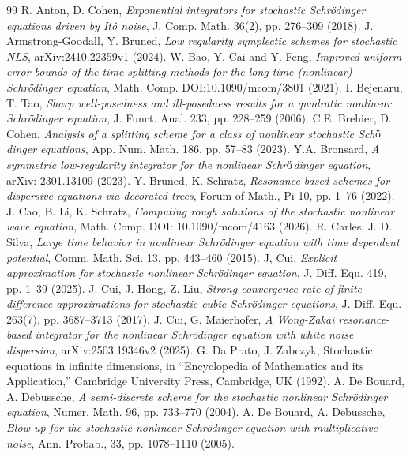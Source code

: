 \documentclass[a4paper]{amsart}
\begin{document}
\begin{thebibliography}{99}
R. Anton, D. Cohen, {\em Exponential integrators for stochastic Schrödinger equations driven by Itô noise}, J. Comp. Math. 36(2), pp. 276--309 (2018).
J. Armstrong-Goodall, Y. Bruned, {\em Low regularity symplectic schemes for stochastic NLS}, arXiv:2410.22359v1 (2024).
W. Bao, Y. Cai and Y. Feng, {\em Improved uniform error bounds of the time-splitting methods
for the long-time (nonlinear) Schrödinger equation}, Math. Comp. DOI:10.1090/mcom/3801 (2021).
  I. Bejenaru, T. Tao, {\em Sharp well-posedness and ill-posedness results for a quadratic nonlinear Schrödinger equation}, J. Funct. Anal. 233, pp. 228--259 (2006).
C.E. Brehier, D. Cohen, {\em Analysis of a splitting scheme for a class of nonlinear stochastic Sch$\ddot{\rm o}$dinger equations}, App. Num. Math. 186, pp. 57--83 (2023).
 Y.A. Bronsard, {\em A symmetric low-regularity integrator for the nonlinear Schr$\ddot{\rm o}$dinger equation}, arXiv: 2301.13109 (2023).
 Y. Bruned, K. Schratz, {\em Resonance based schemes for dispersive equations via decorated
trees}, Forum of Math., Pi 10, pp. 1--76 (2022).
 J. Cao, B. Li, K. Schratz, {\em Computing rough solutions of the stochastic nonlinear wave equation}, Math. Comp. DOI: 10.1090/mcom/4163 (2026).
R. Carles, J. D. Silva, {\em Large time behavior in nonlinear Schrödinger equation with time
dependent potential}, Comm. Math. Sci. 13, pp. 443--460 (2015).
 J, Cui, {\em Explicit approximation for stochastic nonlinear
Schrödinger equation}, J. Diff. Equ. 419, pp. 1--39 (2025).
J. Cui, J. Hong, Z. Liu, {\em Strong convergence rate of finite difference approximations for stochastic cubic Schrödinger equations}, J. Diff. Equ. 263(7), pp. 3687--3713 (2017).
 J. Cui, G. Maierhofer, {\em A Wong-Zakai resonance-based integrator for the nonlinear
Schrödinger equation with white noise dispersion}, arXiv:2503.19346v2 (2025).
G. Da Prato, J. Zabczyk, Stochastic equations in infinite dimensions, in “Encyclopedia of Mathematics and
its Application,” Cambridge University Press, Cambridge, UK (1992).
 A. De Bouard, A. Debussche, {\em A semi-discrete scheme for the stochastic nonlinear Schrödinger
equation}, Numer. Math. 96, pp. 733--770 (2004).
A. De Bouard, A. Debussche, {\em Blow-up for the stochastic nonlinear Schrödinger equation with multiplicative noise}, Ann. Probab., 33, pp. 1078–1110 (2005).

\end{thebibliography}
\end{document}
